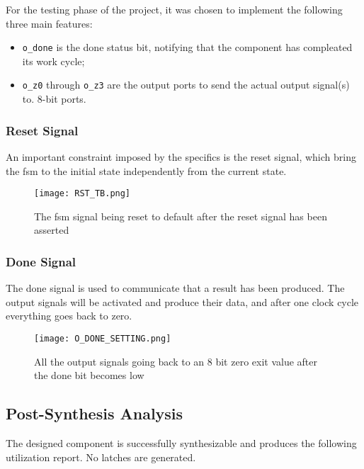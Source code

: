 \documentclass[12pt,a4paper]{article}
\newcommand{\code}{\texttt}
\begin{document}
	For the testing phase of the project, it was chosen to implement the following three main features:

	\begin{itemize}
			\item \code{o\_done} is the done status bit, notifying that the component has compleated its work cycle;
			\item \code{o\_z0} through \code{o\_z3} are the output ports to send the actual output signal(s) to. 8-bit ports.
	\end{itemize}

        \newpage

            \subsubsection{Reset Signal}

            An important constraint imposed by the specifics is the reset signal, which bring the fsm to the initial state independently from the current state. 
            

            \begin{figure}[H]
            	\centering
            	\texttt{[image: RST\_TB.png]}
            	\caption{The fsm signal being reset to default after the reset signal has been asserted}
            	\label{fig:schema}
            \end{figure}




            \subsubsection{Done Signal}

            The done signal is used to communicate that a result has been produced.
            The output signals will be activated and produce their data, and after one clock cycle everything goes back to zero.


            \begin{figure}[H]
            	\centering
            	\texttt{[image: O\_DONE\_SETTING.png]}
            	\caption{All the output signals going back to an 8 bit zero exit value after the done bit becomes low}
            	\label{fig:schema}
            \end{figure}


	
	   \subsection{Post-Synthesis Analysis}
        The designed component is successfully synthesizable and produces the following utilization report. No latches are generated.
        
\end{document}
